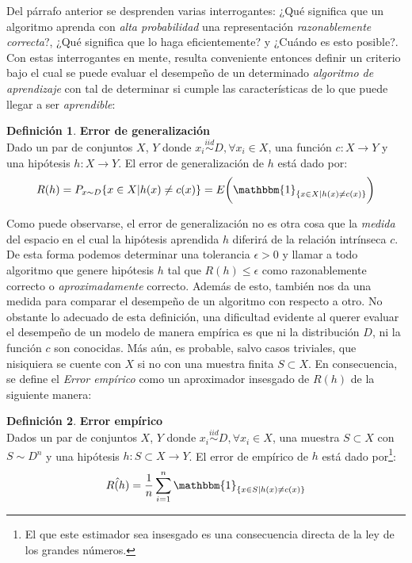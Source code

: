 \documentclass{book}
\theoremstyle{plain}
\theoremstyle{definition}
\newtheorem{defn}{Definición}[section]
\theoremstyle{remark}
\begin{document}
Del párrafo anterior se desprenden varias interrogantes: ¿Qué significa que un algoritmo aprenda con \emph{alta probabilidad} una representación \emph{razonablemente correcta}?, ¿Qué significa que lo haga eficientemente? y ¿Cuándo es esto posible?. Con estas interrogantes en mente, resulta conveniente entonces definir un criterio bajo el cual se puede evaluar el desempeño de un determinado \emph{algoritmo de aprendizaje} con tal de determinar si cumple las características de lo que puede llegar a ser \emph{aprendible}:

\bigskip\bigskip


\begin{defn}\label{eq:def_gen_err}
\textbf{Error de generalización}\\
  Dado un par de conjuntos $X$, $Y$ donde $x_i \stackrel{iid}{\sim} D,\forall x_i\in X$, una función $c:X\rightarrow Y$ y una hipótesis $h:X\rightarrow Y$. El error de generalización de $h$ está dado por:
\begin{equation*}
R(h)=P_{x\sim D}\{x\in X| h(x)\neq c(x)\}=E\bigg(\mathbbm{1}_{\{x\in X| h(x)\neq c(x)\}}\bigg)
\end{equation*}
\end{defn}

Como puede observarse, el error de generalización no es otra cosa que la \emph{medida} del espacio en el cual la hipótesis aprendida $h$ diferirá de la relación intrínseca $c$. De esta forma podemos determinar una tolerancia $\epsilon > 0$ y llamar a todo algoritmo que genere hipótesis $h$ tal que $R(h)\leq\epsilon$ como razonablemente correcto o \emph{aproximadamente} correcto. Además de esto, también nos da una medida para comparar el desempeño de un algoritmo con respecto a otro. No obstante lo adecuado de esta definición, una dificultad evidente al querer evaluar el desempeño de un modelo de manera empírica es que ni la distribución $D$, ni la función $c$ son conocidas. Más aún, es probable, salvo casos triviales, que nisiquiera se cuente con $X$ si no con una muestra finita $S \subset X$. En consecuencia, se define el \emph{Error empírico} como un aproximador insesgado de $R(h)$ de la siguiente manera:
\bigskip

\begin{defn}\label{eq:def_emp_err}
\textbf{Error empírico}\\  Dados un par de conjuntos $X$, $Y$ donde $x_i \stackrel{iid}{\sim} D,\forall x_i\in X$, una muestra $S\subset X$ con $S\sim D^n$ y una hipótesis $h:S\subset X\rightarrow Y$. El error de empírico de $h$ está dado por\footnote{El que este estimador sea insesgado es una consecuencia directa de la ley de los grandes números.\cite{BERNOULLI}}:
\begin{equation*}
\hat{R(h)}=\frac{1}{n}\displaystyle\sum_{i=1}^n\mathbbm{1}_{\{x\in S| h(x)\neq c(x)\}}
\end{equation*}
\end{defn}
\end{document}

